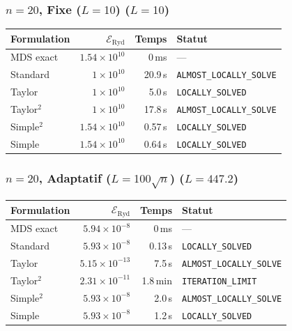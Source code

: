\subsubsection{$n=20$, Fixe ($L{=}10$) ($L=10$)}
\begin{longtable}{@{}lrrl@{}}
  \toprule
  Formulation & $\mathcal{E}_{\mathrm{Ryd}}$ & Temps & Statut \\
  \midrule
  \endhead
  MDS exact & $1.54\times10^{10}$ & 0\,ms & --- \\
  Standard & $1\times10^{10}$ & 20.9\,s & \texttt{ALMOST\_LOCALLY\_SOLVE} \\
  Taylor & $1\times10^{10}$ & 5.0\,s & \texttt{LOCALLY\_SOLVED} \\
  Taylor$^2$ & $1\times10^{10}$ & 17.8\,s & \texttt{ALMOST\_LOCALLY\_SOLVE} \\
  Simple$^2$ & $1.54\times10^{10}$ & 0.57\,s & \texttt{LOCALLY\_SOLVED} \\
  Simple & $1.54\times10^{10}$ & 0.64\,s & \texttt{LOCALLY\_SOLVED} \\
  \bottomrule
\end{longtable}

\subsubsection{$n=20$, Adaptatif ($L{=}100\sqrt{n}$) ($L=447.2$)}
\begin{longtable}{@{}lrrl@{}}
  \toprule
  Formulation & $\mathcal{E}_{\mathrm{Ryd}}$ & Temps & Statut \\
  \midrule
  \endhead
  MDS exact & $5.94\times10^{-8}$ & 0\,ms & --- \\
  Standard & $5.93\times10^{-8}$ & 0.13\,s & \texttt{LOCALLY\_SOLVED} \\
  Taylor & $5.15\times10^{-13}$ & 7.5\,s & \texttt{ALMOST\_LOCALLY\_SOLVE} \\
  Taylor$^2$ & $2.31\times10^{-11}$ & 1.8\,min & \texttt{ITERATION\_LIMIT} \\
  Simple$^2$ & $5.93\times10^{-8}$ & 2.0\,s & \texttt{ALMOST\_LOCALLY\_SOLVE} \\
  Simple & $5.93\times10^{-8}$ & 1.2\,s & \texttt{LOCALLY\_SOLVED} \\
  \bottomrule
\end{longtable}

